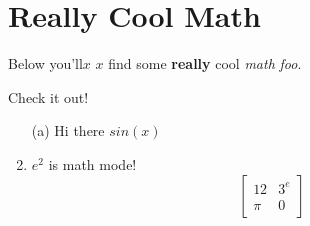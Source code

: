 \section*{Really Cool Math}Below you'll$x$ \(x\) find some {\bf really} cool {\em math} {\em foo}.

\def\foo{FOO}

Check it out!\begin{enumerate}
    \item[(a)] Hi there $sin(x)$
\item$e^2$ is math mode! $$\begin{bmatrix}12&3^e\\\pi&0\end{bmatrix}$$
\end{enumerate}